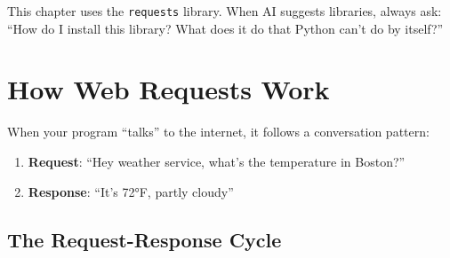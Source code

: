 \documentclass[
  letterpaper,
  DIV=11,
  numbers=noendperiod,
  oneside]{scrreprt}
\providecommand{\tightlist}{%
  \setlength{\itemsep}{0pt}\setlength{\parskip}{0pt}}\usepackage{longtable,booktabs,array}
\begin{document}
\begin{tcolorbox}[enhanced jigsaw, opacityback=0, colback=white, colframe=quarto-callout-important-color-frame, breakable, titlerule=0mm, coltitle=black, rightrule=.15mm, colbacktitle=quarto-callout-important-color!10!white, left=2mm, bottomtitle=1mm, bottomrule=.15mm, title=\textcolor{quarto-callout-important-color}{\faExclamation}\hspace{0.5em}{Installing Libraries}, opacitybacktitle=0.6, toptitle=1mm, leftrule=.75mm, arc=.35mm, toprule=.15mm]

This chapter uses the \texttt{requests} library. When AI suggests
libraries, always ask: ``How do I install this library? What does it do
that Python can't do by itself?''

\end{tcolorbox}

\section{How Web Requests Work}\label{how-web-requests-work}

When your program ``talks'' to the internet, it follows a conversation
pattern:

\begin{enumerate}
\def\labelenumi{\arabic{enumi}.}
\tightlist
\item
  \textbf{Request}: ``Hey weather service, what's the temperature in
  Boston?''
\item
  \textbf{Response}: ``It's 72°F, partly cloudy''
\end{enumerate}

\subsection{The Request-Response
Cycle}\label{the-request-response-cycle}
\end{document}
